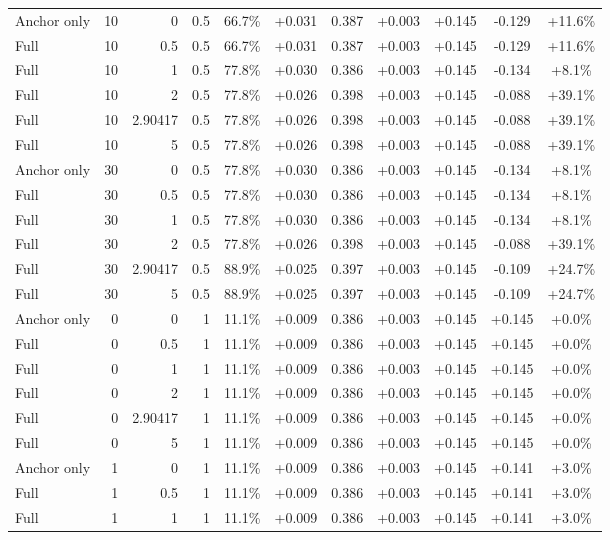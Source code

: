 \begin{table}[htbp]
\begin{tabular}{lrrrccccccc}
Anchor only & 10 & 0 & 0.5 & 66.7\% & +0.031 & 0.387 & +0.003 & +0.145 & -0.129 & +11.6\% \\
Full & 10 & 0.5 & 0.5 & 66.7\% & +0.031 & 0.387 & +0.003 & +0.145 & -0.129 & +11.6\% \\
Full & 10 & 1 & 0.5 & 77.8\% & +0.030 & 0.386 & +0.003 & +0.145 & -0.134 & +8.1\% \\
Full & 10 & 2 & 0.5 & 77.8\% & +0.026 & 0.398 & +0.003 & +0.145 & -0.088 & +39.1\% \\
Full & 10 & 2.90417 & 0.5 & 77.8\% & +0.026 & 0.398 & +0.003 & +0.145 & -0.088 & +39.1\% \\
Full & 10 & 5 & 0.5 & 77.8\% & +0.026 & 0.398 & +0.003 & +0.145 & -0.088 & +39.1\% \\
Anchor only & 30 & 0 & 0.5 & 77.8\% & +0.030 & 0.386 & +0.003 & +0.145 & -0.134 & +8.1\% \\
Full & 30 & 0.5 & 0.5 & 77.8\% & +0.030 & 0.386 & +0.003 & +0.145 & -0.134 & +8.1\% \\
Full & 30 & 1 & 0.5 & 77.8\% & +0.030 & 0.386 & +0.003 & +0.145 & -0.134 & +8.1\% \\
Full & 30 & 2 & 0.5 & 77.8\% & +0.026 & 0.398 & +0.003 & +0.145 & -0.088 & +39.1\% \\
Full & 30 & 2.90417 & 0.5 & 88.9\% & +0.025 & 0.397 & +0.003 & +0.145 & -0.109 & +24.7\% \\
Full & 30 & 5 & 0.5 & 88.9\% & +0.025 & 0.397 & +0.003 & +0.145 & -0.109 & +24.7\% \\
Anchor only & 0 & 0 & 1 & 11.1\% & +0.009 & 0.386 & +0.003 & +0.145 & +0.145 & +0.0\% \\
Full & 0 & 0.5 & 1 & 11.1\% & +0.009 & 0.386 & +0.003 & +0.145 & +0.145 & +0.0\% \\
Full & 0 & 1 & 1 & 11.1\% & +0.009 & 0.386 & +0.003 & +0.145 & +0.145 & +0.0\% \\
Full & 0 & 2 & 1 & 11.1\% & +0.009 & 0.386 & +0.003 & +0.145 & +0.145 & +0.0\% \\
Full & 0 & 2.90417 & 1 & 11.1\% & +0.009 & 0.386 & +0.003 & +0.145 & +0.145 & +0.0\% \\
Full & 0 & 5 & 1 & 11.1\% & +0.009 & 0.386 & +0.003 & +0.145 & +0.145 & +0.0\% \\
Anchor only & 1 & 0 & 1 & 11.1\% & +0.009 & 0.386 & +0.003 & +0.145 & +0.141 & +3.0\% \\
Full & 1 & 0.5 & 1 & 11.1\% & +0.009 & 0.386 & +0.003 & +0.145 & +0.141 & +3.0\% \\
Full & 1 & 1 & 1 & 11.1\% & +0.009 & 0.386 & +0.003 & +0.145 & +0.141 & +3.0\% \\

\end{tabular}
\end{table}
